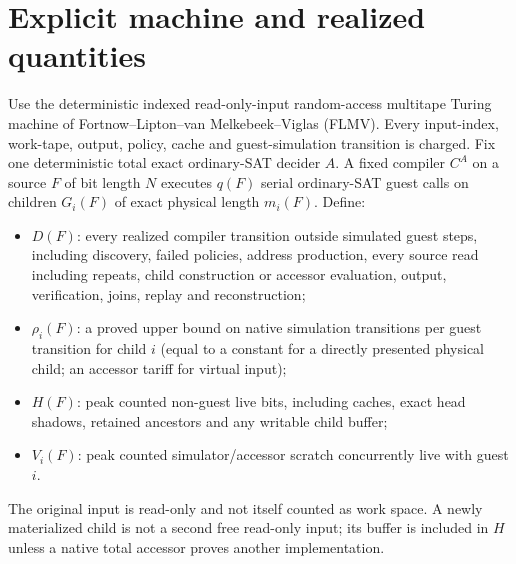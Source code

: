 \documentclass[11pt]{article}
\begin{document}
\section{Explicit machine and realized quantities}
Use the deterministic indexed read-only-input random-access multitape Turing
machine of Fortnow--Lipton--van Melkebeek--Viglas (FLMV).  Every input-index,
work-tape, output, policy, cache and guest-simulation transition is charged.
Fix one deterministic total exact ordinary-SAT decider $A$.  A fixed compiler
$C^A$ on a source $F$ of bit length $N$ executes $q(F)$ serial ordinary-SAT
guest calls on children $G_i(F)$ of exact physical length $m_i(F)$.  Define:
\begin{itemize}
\item $D(F)$: every realized compiler transition outside simulated guest
steps, including discovery, failed policies, address production, every source
read including repeats, child construction or accessor evaluation, output,
verification, joins, replay and reconstruction;
\item $\rho_i(F)$: a proved upper bound on native simulation transitions per
guest transition for child $i$ (equal to a constant for a directly presented
physical child; an accessor tariff for virtual input);
\item $H(F)$: peak counted non-guest live bits, including caches, exact head
shadows, retained ancestors and any writable child buffer;
\item $V_i(F)$: peak counted simulator/accessor scratch concurrently live with
guest $i$.
\end{itemize}
The original input is read-only and not itself counted as work space.  A newly
materialized child is not a second free read-only input; its buffer is included
in $H$ unless a native total accessor proves another implementation.
\end{document}
